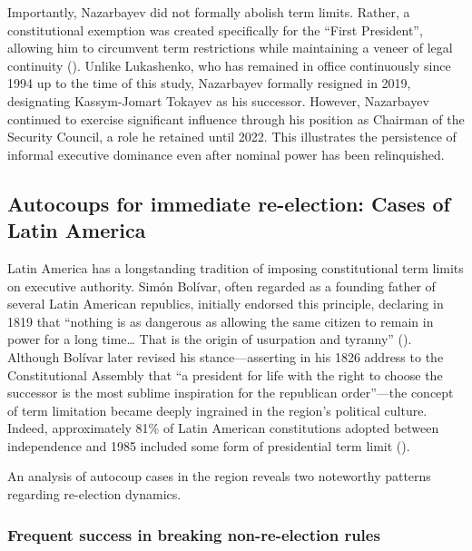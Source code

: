 \documentclass[
  12pt,
]{report}
\begin{document}
Importantly, Nazarbayev did not formally abolish term limits. Rather, a
constitutional exemption was created specifically for the ``First
President'', allowing him to circumvent term restrictions while
maintaining a veneer of legal continuity
(). Unlike
Lukashenko, who has remained in office continuously since 1994 up to the
time of this study, Nazarbayev formally resigned in 2019, designating
Kassym-Jomart Tokayev as his successor. However, Nazarbayev continued to
exercise significant influence through his position as Chairman of the
Security Council, a role he retained until 2022. This illustrates the
persistence of informal executive dominance even after nominal power has
been relinquished.

\subsection*{Autocoups for immediate re-election: Cases of Latin
America}\label{autocoups-for-immediate-re-election-cases-of-latin-america}

Latin America has a longstanding tradition of imposing constitutional
term limits on executive authority. Simón Bolívar, often regarded as a
founding father of several Latin American republics, initially endorsed
this principle, declaring in 1819 that ``nothing is as dangerous as
allowing the same citizen to remain in power for a long time\ldots{}
That is the origin of usurpation and tyranny''
(). Although
Bolívar later revised his stance---asserting in his 1826 address to the
Constitutional Assembly that ``a president for life with the right to
choose the successor is the most sublime inspiration for the republican
order''---the concept of term limitation became deeply ingrained in the
region's political culture. Indeed, approximately 81\% of Latin American
constitutions adopted between independence and 1985 included some form
of presidential term limit
().

An analysis of autocoup cases in the region reveals two noteworthy
patterns regarding re-election dynamics.

\subsubsection*{Frequent success in breaking non-re-election
rules}\label{frequent-success-in-breaking-non-re-election-rules}
\end{document}
